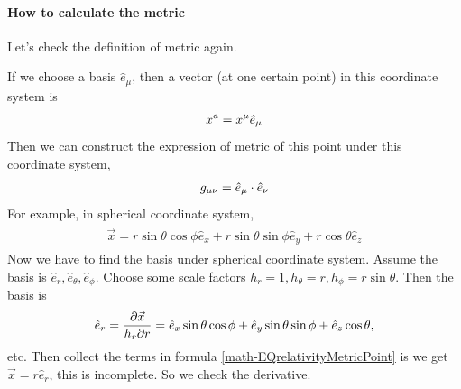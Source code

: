 \documentclass[letterpaper,10pt,english]{sphinxmanual}
\begin{document}
\paragraph{How to calculate the metric}
\label{math:how-to-calculate-the-metric}
Let's check the definition of metric again.

If we choose a basis \(\hat e_\mu\), then a vector (at one certain point) in this coordinate system is
\begin{gather}
\begin{split}x^a=x^\mu \hat e_\mu\end{split}\notag
\end{gather}
Then we can construct the expression of metric of this point under this coordinate system,
\begin{gather}
\begin{split}g_{\mu\nu}=\hat e_\mu\cdot \hat e_\nu\end{split}\notag
\end{gather}
For example, in spherical coordinate system,
\label{math:equation-EQrelativityMetricPoint}\begin{gather}
\begin{split}\vec x=r\sin \theta\cos\phi \hat e_x+r\sin\theta\sin\phi \hat e_y+r\cos\theta \hat e_z\end{split}\label{math-EQrelativityMetricPoint}
\end{gather}
Now we have to find the basis under spherical coordinate system. Assume the basis is \(\hat e_r, \hat e_\theta, \hat e_\phi\). Choose some scale factors \(h_r=1, h_\theta=r, h_\phi=r\sin\theta\). Then the basis is
\begin{gather}
\begin{split}\hat e_r=\frac{\partial \vec x}{h_r\partial r}=\hat e_x \sin\theta\cos\phi+\hat e_y \sin\theta\sin\phi+\hat e_z \cos\theta,\end{split}\notag
\end{gather}
etc. Then collect the terms in formula \eqref{math-EQrelativityMetricPoint} is we get \(\vec x=r\hat e_r\), this is incomplete. So we check the derivative.
\end{document}
